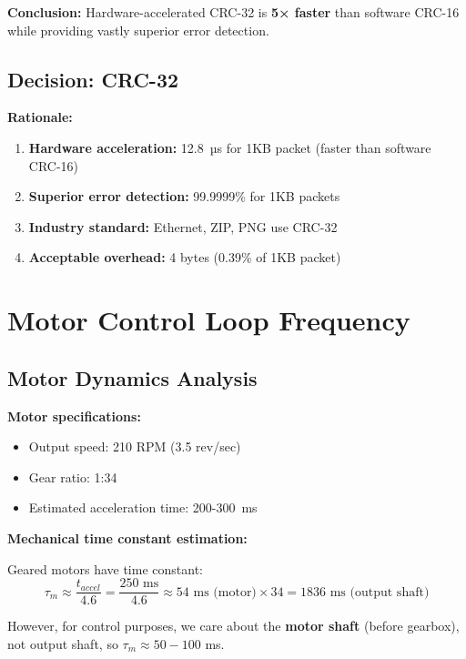 \textbf{Conclusion:} Hardware-accelerated CRC-32 is \textbf{5× faster} than software CRC-16 while providing vastly superior error detection.

\subsection{Decision: CRC-32}

\textbf{Rationale:}
\begin{enumerate}
    \item \textbf{Hardware acceleration:} 12.8~µs for 1KB packet (faster than software CRC-16)
    \item \textbf{Superior error detection:} 99.9999\% for 1KB packets
    \item \textbf{Industry standard:} Ethernet, ZIP, PNG use CRC-32
    \item \textbf{Acceptable overhead:} 4 bytes (0.39\% of 1KB packet)
\end{enumerate}

\section{Motor Control Loop Frequency}

\subsection{Motor Dynamics Analysis}

\textbf{Motor specifications:}
\begin{itemize}
    \item Output speed: 210 RPM (3.5 rev/sec)
    \item Gear ratio: 1:34
    \item Estimated acceleration time: 200-300~ms
\end{itemize}

\textbf{Mechanical time constant estimation:}

Geared motors have time constant:
\begin{equation}
\tau_m \approx \frac{t_{accel}}{4.6} = \frac{250 \text{ ms}}{4.6} \approx 54 \text{ ms (motor)} \times 34 = 1836 \text{ ms (output shaft)}
\end{equation}

However, for control purposes, we care about the \textbf{motor shaft} (before gearbox), not output shaft, so $\tau_m \approx 50-100$ ms.

